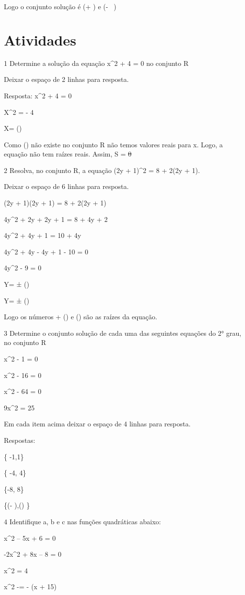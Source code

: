 Logo o conjunto solução é (+ ) e (- \ )

\section{Atividades}

\num{1} Determine a solução da equação x^2 + 4 = 0 no conjunto R

Deixar o espaço de 2 linhas para resposta.

Resposta: x^2 + 4 = 0

X^2 = - 4

X= ()

Como () não existe no conjunto R não temos valores reais
para x. Logo, a equação não tem raízes reais. Assim, S = \sout{0}

\num{2} Resolva, no conjunto R, a equação (2y + 1)^2 = 8 + 2(2y + 1).

Deixar o espaço de 6 linhas para resposta.

(2y + 1)(2y + 1) = 8 + 2(2y + 1)

4y^2 + 2y + 2y + 1 = 8 + 4y + 2

4y^2 + 4y + 1 = 10 + 4y

4y^2 + 4y - 4y + 1 - 10 = 0

4y^2 - 9 = 0

Y= ± ()

Y= ± ()

Logo os números + () e () são as raízes da
equação.

\num{3} Determine o conjunto solução de cada uma das seguintes equações do 2°
grau, no conjunto R

\item x^2 - 1 = 0
\item x^2 - 16 = 0
\item x^2 - 64 = 0
\item 9x^2 = 25

Em cada item acima deixar o espaço de 4 linhas para resposta.

Respostas:

\item \{ -1,1\}
\item \{ -4, 4\}
\item \{-8, 8\}
\item \{(- ),() \}

\num{4} Identifique a, b e c nas funções quadráticas abaixo:

\item x^2 -- 5x + 6 = 0
\item -2x^2 + 8x -- 8 = 0
\item x^2 = 4
\item x^2 -\times = - (x + 15)

